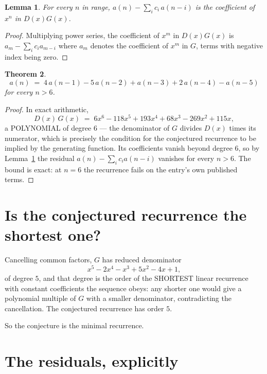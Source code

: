 \documentclass[11pt,a4paper]{article}
\theoremstyle{plain}
\newtheorem{theorem}{Theorem}
\newtheorem{lemma}[theorem]{Lemma}
\theoremstyle{definition}
\begin{document}
\begin{lemma}\label{lem:key}
For every $n$ in range, $a(n)-\sum_i c_i\,a(n-i)$ is the coefficient of $x^{n}$ in
$D(x)G(x)$.
\end{lemma}

\begin{proof}
Multiplying power series, the coefficient of $x^{m}$ in $D(x)G(x)$ is
$a_m-\sum_i c_i a_{m-i}$ where $a_m$ denotes the coefficient of $x^{m}$ in $G$, terms with
negative index being zero.
\end{proof}

\begin{theorem}
\[
a(n)\;=\;4\,a(n-1) - 5\,a(n-2) + a(n-3) + 2\,a(n-4) - a(n-5)
\]
for every $n>6$.
\end{theorem}

\begin{proof}
In exact arithmetic,
\[
D(x)\,G(x)\;=\;6 x^{6} - 118 x^{5} + 193 x^{4} + 68 x^{3} - 269 x^{2} + 115 x,
\]
a POLYNOMIAL of degree $6$ --- the denominator of $G$ divides $D(x)$ times its numerator,
which is precisely the condition for the conjectured recurrence to be implied by the
generating function. Its coefficients vanish beyond degree $6$, so by
Lemma~\ref{lem:key} the residual $a(n)-\sum_ic_ia(n-i)$ vanishes for every
$n>6$. The bound is exact: at $n=6$ the recurrence fails on the entry's own published terms.
\end{proof}

\section{Is the conjectured recurrence the shortest one?}

Cancelling common factors, $G$ has reduced denominator
\[
x^{5} - 2 x^{4} - x^{3} + 5 x^{2} - 4 x + 1,
\]
of degree $5$, and that degree is the order of the SHORTEST linear recurrence with
constant coefficients the sequence obeys: any shorter one would give a polynomial multiple of
$G$ with a smaller denominator, contradicting the cancellation. The conjectured recurrence has
order $5$.

So the conjecture is the minimal recurrence.

\section{The residuals, explicitly}
\end{document}
